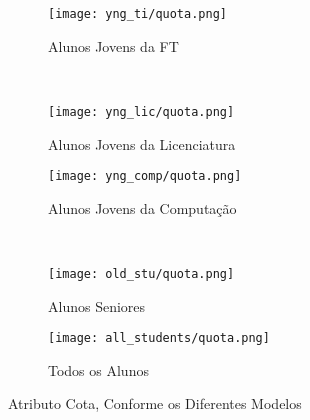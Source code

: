 \clearpage
\begin{figure}[!ht]
    \centering
    \begin{subfigure}[b]{0.48\textwidth}
        \centering
        \texttt{[image: yng\_ti/quota.png]}
        \caption{Alunos Jovens da FT}
    \end{subfigure}
    ~
    \begin{subfigure}[b]{0.48\textwidth}
        \centering
        \texttt{[image: yng\_lic/quota.png]}
        \caption{Alunos Jovens da Licenciatura}
    \end{subfigure}

    \begin{subfigure}[b]{0.48\textwidth}
        \centering
        \texttt{[image: yng\_comp/quota.png]}
        \caption{Alunos Jovens da Computação}
    \end{subfigure}
    ~
    \begin{subfigure}[b]{0.48\textwidth}
        \centering
        \texttt{[image: old\_stu/quota.png]}
        \caption{Alunos Seniores}
    \end{subfigure}

    \begin{subfigure}[b]{0.48\textwidth}
        \centering
        \texttt{[image: all\_students/quota.png]}
        \caption{Todos os Alunos}
    \end{subfigure}
    \caption{Atributo Cota, Conforme os Diferentes Modelos}
\end{figure}

